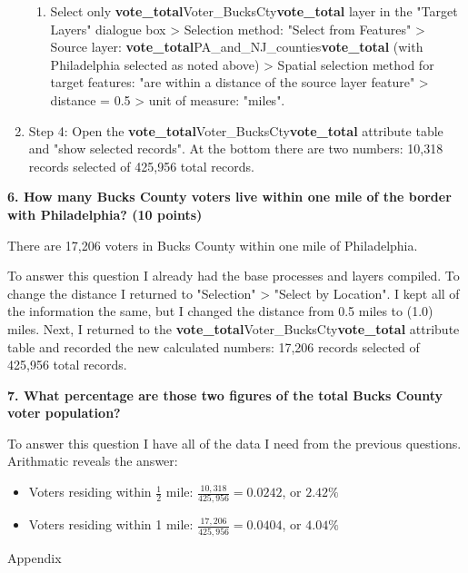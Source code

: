 \documentclass[12pt]{article}
\begin{document}
\begin{enumerate}
\begin{enumerate}
		\item Select only \textbf{vote\_total}Voter\_BucksCty\textbf{vote\_total} layer in the "Target Layers" dialogue box > Selection method:  "Select from Features" > Source layer:  \textbf{vote\_total}PA\_and\_NJ\_counties\textbf{vote\_total} (with Philadelphia selected as noted above) > Spatial selection method for target features:  "are within a distance of the source layer feature" > distance = 0.5 > unit of measure:  "miles".
	\end{enumerate}
	\item Step 4:  Open the \textbf{vote\_total}Voter\_BucksCty\textbf{vote\_total} attribute table and "show selected records".  At the bottom there are two numbers:  10,318 records selected of 425,956 total records.
\end{enumerate}

\noindent \textbf{6.  How many Bucks County voters live within one mile of the border with Philadelphia?  (10 points)}

There are 17,206 voters in Bucks County within one mile of Philadelphia.

To answer this question I already had the base processes and layers compiled.  To change the distance I returned to "Selection" > "Select by Location".  I kept all of the information the same, but I changed the distance from 0.5 miles to (1.0) miles.  Next, I returned to the \textbf{vote\_total}Voter\_BucksCty\textbf{vote\_total} attribute table and recorded the new calculated numbers:  17,206 records selected of 425,956 total records.

\noindent \textbf{7.  What percentage are those two figures of the total Bucks County voter population?}

To answer this question I have all of the data I need from the previous questions.  Arithmatic reveals the answer:  

\begin{itemize}
	\item Voters residing within $\frac{1}{2}$ mile:  $\frac{10,318}{425,956} = 0.0242$, or $2.42\%$
	\item Voters residing within 1 mile:  $\frac{17,206}{425,956} = 0.0404$, or $4.04\%$
\end{itemize}

\clearpage

Appendix


\end{document}
